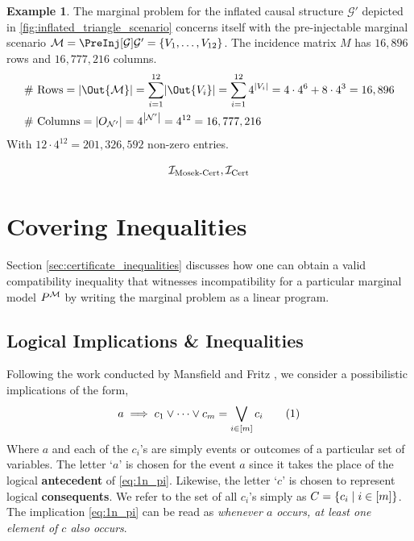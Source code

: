 \documentclass[aps, 10pt, english, twoside, pra, nofootinbib, longbibliography]{revtex4-1}
\theoremstyle{plain}
\theoremstyle{definition}
\newtheorem{example}[theorem]{Example}
\theoremstyle{remark}
\newcommand{\graph}{\mathcal{G}}
\newcommand{\nodes}{\mathcal{N}}
\newcommand{\mscenario}{\mathcal{M}}
\newcommand{\term}[1]{\textcolor{Mahogany}{\textbf{#1}}}
\begin{document}
    \begin{example}
        The marginal problem for the inflated causal structure $\graph'$ depicted in \cref{fig:inflated_triangle_scenario} concerns itself with the pre-injectable marginal scenario $\mscenario = \PreInj[\graph]{\graph'} = \bc{V_1, \ldots, V_{12}}$. The incidence matrix $M$ has $16,896$ rows and $16,777,216$ columns.
        \begin{align*}
            &\text{\# Rows} = \abs{\Out{\mscenario}} = \sum_{i=1}^{12} \abs{\Out{V_i}} = \sum_{i=1}^{12} 4^{\abs{V_i}} = 4 \cdot 4^6 + 8 \cdot 4^3 = 16,896 \\
            &\text{\# Columns} = \abs{O_{\nodes'}} = 4^{\abs{\nodes'}} = 4^{12} = 16,777,216
        \end{align*}
        With $12 \cdot 4^{12} = 201,326,592$ non-zero entries.
    \end{example}


    \[ \mathcal{I}_\text{Mosek-Cert}, \mathcal{I}_\text{Cert} \]

    \section{Covering Inequalities}

    Section \ref{sec:certificate_inequalities} discusses how one can obtain a valid compatibility inequality that witnesses incompatibility for a particular marginal model $\prob^{\mscenario}$ by writing the marginal problem as a linear program.
    \subsection{Logical Implications \& Inequalities}
    \label{sec:implication_inequalities}
    Following the work conducted by Mansfield and Fritz \cite{Mansfield_2012}, we consider a possibilistic implications of the form,
    \[ a \implies c_1 \lor \cdots \lor c_m = \bigvee_{i\in \bs{m}} c_i \eq \label{eq:1n_pi}\]
    Where $a$ and each of the $c_i$'s are simply events or outcomes of a particular set of variables. The letter `$a$' is chosen for the event $a$ since it takes the place of the logical \term{antecedent} of \cref{eq:1n_pi}. Likewise, the letter `$c$' is chosen to represent logical \term{consequents}. We refer to the set of all $c_i$'s simply as $C = \bc{c_i \mid i \in \bs{m}}$. The implication \cref{eq:1n_pi} can be read as \textit{whenever $a$ occurs, at least one element of $c$ also occurs}.
\end{document}
